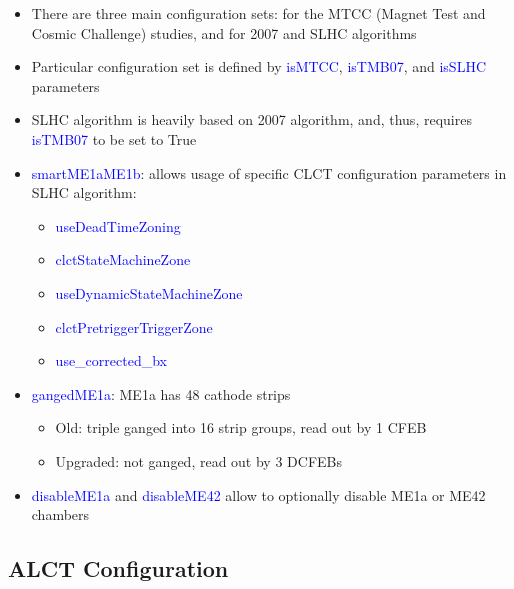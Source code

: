 \begin{itemize}
	\item There are three main configuration sets: for the MTCC (Magnet Test and Cosmic Challenge) studies, and for 2007 and SLHC algorithms
	\item Particular configuration set is defined by \textcolor{blue}{isMTCC}, \textcolor{blue}{isTMB07}, and \textcolor{blue}{isSLHC} parameters
	\item SLHC algorithm is heavily based on 2007 algorithm, and, thus, requires \textcolor{blue}{isTMB07} to be set to True
	\item \textcolor{blue}{smartME1aME1b}: allows usage of specific CLCT configuration parameters in SLHC algorithm:
	\begin{itemize}
		\item \textcolor{blue}{useDeadTimeZoning}
		\item \textcolor{blue}{clctStateMachineZone}
		\item \textcolor{blue}{useDynamicStateMachineZone}
		\item \textcolor{blue}{clctPretriggerTriggerZone}
		\item \textcolor{blue}{use\_corrected\_bx}
	\end{itemize}
	\item \textcolor{blue}{gangedME1a}: ME1a has 48 cathode strips
	\begin{itemize}
		\item Old: triple ganged into 16 strip groups,  read out by 1 CFEB
		\item Upgraded: not ganged, read out by 3 DCFEBs
	\end{itemize}
	\item \textcolor{blue}{disableME1a} and \textcolor{blue}{disableME42} allow to optionally disable ME1a or ME42 chambers
\end{itemize}

\subsection{ALCT Configuration}
\label{sec:ALCT_conf}

